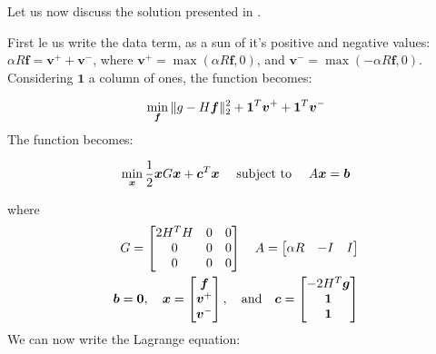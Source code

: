 \documentclass[12pt,a4paper,twoside]{report}
\begin{document}
Let us now discuss the solution presented in \cite{fu2006efficient}.

First le us write the data term, as a sun of it's positive and negative values:  $\alpha R \boldsymbol{f} = \boldsymbol{v}^+ + \boldsymbol{v}^-$, where $\boldsymbol{v}^+ = \max(\alpha R \boldsymbol{f}, 0) $, and  $\boldsymbol{v}^- = \max(-\alpha R \boldsymbol{f}, 0) $. Considering $\boldsymbol{1}$ a column of ones, the function becomes:

\begin{equation} \label{l2l1}
\min_{\boldsymbol{f}}\Arrowvert g - H\boldsymbol{f}\Arrowvert_2^2+ 
\boldsymbol{1}^T \boldsymbol{v}^+ +\boldsymbol{1}^T \boldsymbol{v}^-
\end{equation}
The function becomes:

\begin{equation}
	\min_{\boldsymbol{x}}\frac{1}{2}\boldsymbol{x}G\boldsymbol{x} + \boldsymbol{c}^T\boldsymbol{x} \ \ \
	\textnormal{ subject to } \ \ \  A\boldsymbol{x} = \boldsymbol{b}
\end{equation}

where
\begin{equation}
	\begin{split}
	G = \begin{bmatrix}
	2H^TH & 0 & 0\\
	 0 & 0 & 0 \\
	 0 & 0& 0
	\end{bmatrix} \ \ \ 
	A = \begin{bmatrix}
	\alpha R & -I & I
	\end{bmatrix} \\
	\boldsymbol{b} = \boldsymbol{0} , \ \ \ 
	 \boldsymbol{x} = \begin{bmatrix}
	 \boldsymbol{f} \\ \boldsymbol{v}^+
 \\\boldsymbol{v}^-
 	 \end{bmatrix} ,\ \ \ \textnormal{and} \ \ \ 
 	  \boldsymbol{c} = \begin{bmatrix}
 	  -2H^T\boldsymbol{g} \\ \boldsymbol{1}
 	  \\\boldsymbol{1}
 	  \end{bmatrix}
 	\end{split} 
\end{equation}
We can now write the Lagrange equation:
\end{document}
